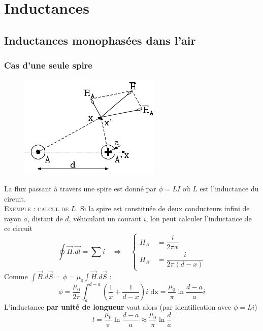 \newpage
\section{Inductances}
	\subsection{Inductances monophasées dans l'air}
		\subsubsection{Cas d'une seule spire}
				\begin{figure}
		\vspace{-5mm}
		\includegraphics[scale=0.4]{ch3/image2.png}
		\end{figure}
		La flux passant à travers une spire est donné par $\phi = 
		LI$ où 		$L$ est l'inductance du circuit.\\
		\textsc{Exemple : calcul de $L$}. Si la spire est constituée 
		de deux conducteurs infini de rayon $a$, distant de $d$, 
		véhiculant un courant $i$, lon peut calculer l'inductance de 
		ce circuit
		\begin{equation}
		\oint \vec{H}.\vec{dl} = \sum i\quad\Rightarrow\quad \left\{
		\begin{array}{ll}
		H_A &= \dfrac{i}{2\pi x}\\
		H_{A'} &= \dfrac{i}{2\pi(d-x)}		
		\end{array}\right.
		\end{equation}
		Comme $\int\vec{B}.d\vec{S} = \phi = \mu_0\int\vec{H}.d\vec{S}$ :
		\begin{equation}
		\phi = \frac{\mu_0}{2\pi}\int_{a}^{d-a}\left(\frac{1}{x}+
		\frac{1}{d-x}\right) i \text{ dx} = \frac{\mu_0}{\pi}\ln
		\frac{d-a}{a}i
		\end{equation}
		L'inductance \textbf{par unité de longueur} vaut alors (par 
		identification 	avec $\phi = Li$)
		\begin{equation}
		l = \frac{\mu_0}{\pi}\ln\frac{d-a}{a}\approx\frac{\mu_0}{
		\pi}\ln\frac{d
		}{a}
		\end{equation}
		
